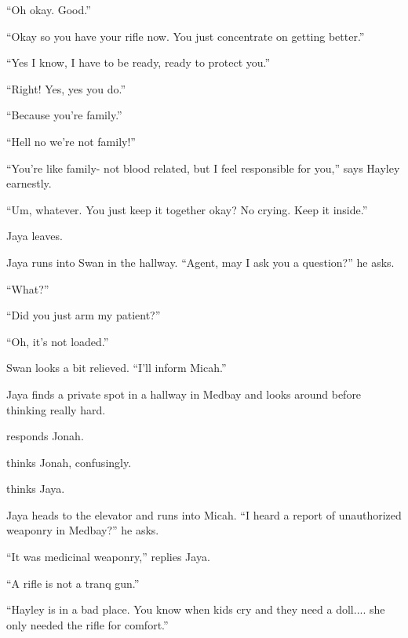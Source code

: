 ``Oh okay.  Good.''

``Okay so you have your rifle now.  You just concentrate on getting better.''

``Yes I know, I have to be ready, ready to protect you.''

``Right!  Yes, yes you do.''

``Because you're family.''

``Hell no we're not family!''

``You're like family- not blood related, but I feel responsible for you,'' says Hayley earnestly.

``Um, whatever.  You just keep it together okay?  No crying.  Keep it inside.''

Jaya leaves.





Jaya runs into Swan in the hallway.  ``Agent, may I ask you a question?'' he asks.

``What?''

``Did you just arm my patient?'' 

``Oh, it's not loaded.''

Swan looks a bit relieved. ``I'll inform Micah.''



Jaya finds a private spot in a hallway in Medbay and looks around before thinking   really hard.

  responds Jonah.




  thinks Jonah, confusingly.

 thinks Jaya.




Jaya heads to the elevator and runs into Micah.  ``I heard a report of unauthorized weaponry in Medbay?'' he asks.

``It was medicinal weaponry,'' replies Jaya.

``A rifle is not a tranq gun.''

``Hayley is in a bad place.  You know when kids cry and they need a doll.... she only needed the rifle for comfort.''

